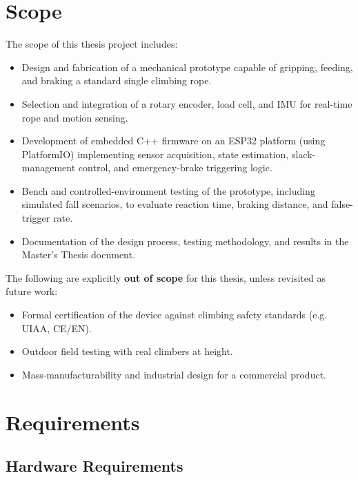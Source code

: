 \documentclass[11pt, a4paper]{article}
\begin{document}
\section{Scope}

The scope of this thesis project includes:

\begin{itemize}[leftmargin=1.2cm]
    \item Design and fabrication of a mechanical prototype capable of
        gripping, feeding, and braking a standard single climbing rope.
    \item Selection and integration of a rotary encoder, load cell, and
        IMU for real-time rope and motion sensing.
    \item Development of embedded C++ firmware on an ESP32 platform
        (using PlatformIO) implementing sensor acquisition, state
        estimation, slack-management control, and emergency-brake
        triggering logic.
    \item Bench and controlled-environment testing of the prototype,
        including simulated fall scenarios, to evaluate reaction time,
        braking distance, and false-trigger rate.
    \item Documentation of the design process, testing methodology, and
        results in the Master's Thesis document.
\end{itemize}

The following are explicitly \textbf{out of scope} for this thesis, unless
revisited as future work:

\begin{itemize}[leftmargin=1.2cm]
    \item Formal certification of the device against climbing safety
        standards (e.g. UIAA, CE/EN).
    \item Outdoor field testing with real climbers at height.
    \item Mass-manufacturability and industrial design for a commercial
        product.
\end{itemize}

\section{Requirements}

\subsection{Hardware Requirements}
\end{document}
